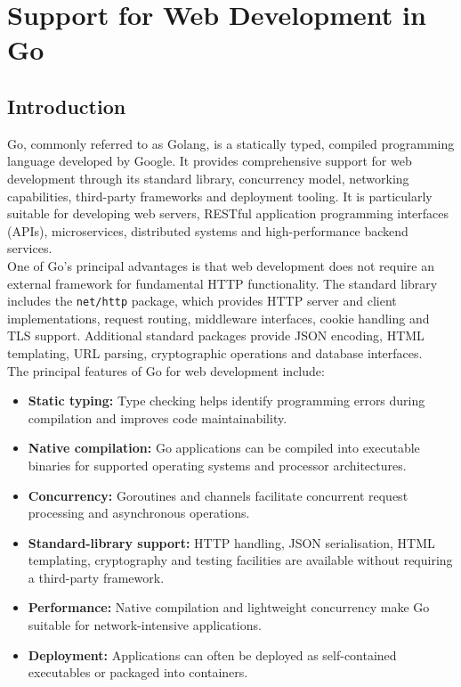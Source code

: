 \section{Support for Web Development in Go}

\subsection{Introduction}

Go, commonly referred to as Golang, is a statically typed, compiled programming language developed by Google. It provides comprehensive support for web development through its standard library, concurrency model, networking capabilities, third-party frameworks and deployment tooling. It is particularly suitable for developing web servers, RESTful application programming interfaces (APIs), microservices, distributed systems and high-performance backend services.\\

One of Go's principal advantages is that web development does not require an external framework for fundamental HTTP functionality. The standard library includes the \texttt{net/http} package, which provides HTTP server and client implementations, request routing, middleware interfaces, cookie handling and TLS support. Additional standard packages provide JSON encoding, HTML templating, URL parsing, cryptographic operations and database interfaces.\\

The principal features of Go for web development include:

\begin{itemize}
    \item \textbf{Static typing:} Type checking helps identify programming errors during compilation and improves code maintainability.
    \item \textbf{Native compilation:} Go applications can be compiled into executable binaries for supported operating systems and processor architectures.
    \item \textbf{Concurrency:} Goroutines and channels facilitate concurrent request processing and asynchronous operations.
    \item \textbf{Standard-library support:} HTTP handling, JSON serialisation, HTML templating, cryptography and testing facilities are available without requiring a third-party framework.
    \item \textbf{Performance:} Native compilation and lightweight concurrency make Go suitable for network-intensive applications.
    \item \textbf{Deployment:} Applications can often be deployed as self-contained executables or packaged into containers.
\end{itemize}

